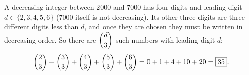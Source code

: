 A decreasing integer between $2000$ and $7000$ has four digits and leading digit $d\in\{2,3,4,5,6\}$ ($7000$ itself is not decreasing). Its other three digits are three different digits less than $d$, and once they are chosen they must be written in decreasing order. So there are $\dbinom d3$ such numbers with leading digit $d$:
\[
\dbinom23+\dbinom33+\dbinom43+\dbinom53+\dbinom63=0+1+4+10+20=\boxed{35}.
\]
